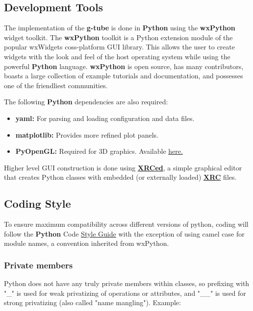 \documentclass[12pt]{article}
\begin{document}
\subsection*{Development Tools}

	The implementation of the {\bf g-tube} is done in {\bf Python} using the {\bf wxPython} widget toolkit. The {\bf wxPython} toolkit is a Python extension module of the popular {wxWidgets} coss-platform GUI library. This allows the user to create widgets with the look and feel of the host operating system while using the powerful {\bf Python} language. {\bf wxPython} is open source, has many contributors, boasts a large collection of example tutorials and documentation, and possesses one of the friendliest communities. 


The following {\bf Python} dependencies are also required:

\begin{itemize}	
\item[] {\bf yaml:} For parsing and loading configuration and data files.
\item[] {\bf matplotlib:} Provides more refined plot panels.
\item[] {\bf PyOpenGL:} Required for 3D graphics. Available \href{http://pyopengl.sourceforge.net/}{here.}
\end{itemize}

Higher level GUI construction is done using \href{http://xrced.sourceforge.net/}{\bf XRCed}, a simple graphical editor that creates Python classes with embedded (or externally loaded) \href{http://wiki.wxpython.org/XRCTutorial}{\bf XRC} files. 


\subsection*{Coding Style}
	To ensure maximum compatibility across different versions of python, coding will follow the {\bf Python} Code \href{http://www.python.org/dev/peps/pep-0008/}{Style Guide} with the exception of using camel case for module names, a convention inherited from wxPython. 
	
\subsubsection*{Private members}	
	Python does not have any truly private members within classes, so prefixing with "\_" is used for weak privatizing of operations or attributes, and "\_\_" is used for strong privatizing (also called "name mangling"). Example:
	
\end{document}
